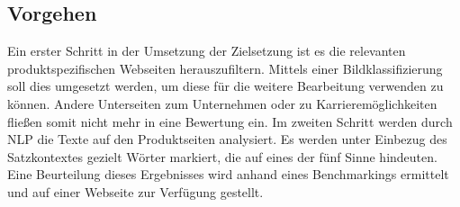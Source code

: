 \subsection{Vorgehen}
Ein erster Schritt in der Umsetzung der Zielsetzung ist es die relevanten produktspezifischen Webseiten herauszufiltern. Mittels einer Bildklassifizierung soll dies umgesetzt werden, um diese für die weitere Bearbeitung verwenden zu können.
Andere Unterseiten zum Unternehmen oder zu Karrieremöglichkeiten fließen somit nicht mehr in eine Bewertung ein. Im zweiten Schritt werden durch \acf{NLP} die Texte auf den Produktseiten analysiert. Es werden unter Einbezug des Satzkontextes gezielt Wörter markiert, die auf eines der fünf Sinne hindeuten.
Eine Beurteilung dieses Ergebnisses wird anhand eines Benchmarkings ermittelt und auf einer Webseite zur Verfügung gestellt.

